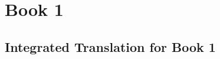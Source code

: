 \chapter{Book 1}











\section{Integrated Translation for Book 1} %
\label{sec:section_name}

